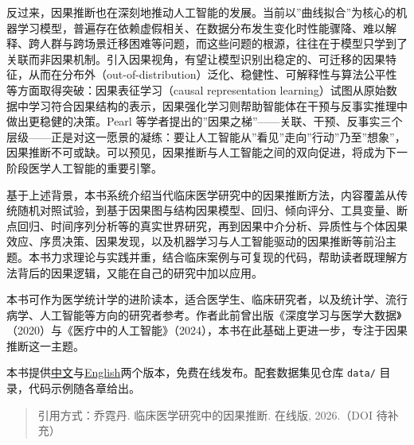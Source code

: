 \documentclass[
  chinese-hans,
  letterpaper,
  DIV=11,
  numbers=noendperiod]{scrreprt}
\begin{document}
反过来，因果推断也在深刻地推动人工智能的发展。当前以''曲线拟合''为核心的机器学习模型，普遍存在依赖虚假相关、在数据分布发生变化时性能骤降、难以解释、跨人群与跨场景迁移困难等问题，而这些问题的根源，往往在于模型只学到了关联而非因果机制。引入因果视角，有望让模型识别出稳定的、可迁移的因果特征，从而在分布外（out-of-distribution）泛化、稳健性、可解释性与算法公平性等方面取得突破：因果表征学习（causal
representation
learning）试图从原始数据中学习符合因果结构的表示，因果强化学习则帮助智能体在干预与反事实推理中做出更稳健的决策。Pearl
等学者提出的''因果之梯''------关联、干预、反事实三个层级------正是对这一愿景的凝练：要让人工智能从''看见''走向''行动''乃至''想象''，因果推断不可或缺。可以预见，因果推断与人工智能之间的双向促进，将成为下一阶段医学人工智能的重要引擎。

基于上述背景，本书系统介绍当代临床医学研究中的因果推断方法，内容覆盖从传统随机对照试验，到基于因果图与结构因果模型、回归、倾向评分、工具变量、断点回归、时间序列分析等的真实世界研究，再到因果中介分析、异质性与个体因果效应、序贯决策、因果发现，以及机器学习与人工智能驱动的因果推断等前沿主题。本书力求理论与实践并重，结合临床案例与可复现的代码，帮助读者既理解方法背后的因果逻辑，又能在自己的研究中加以应用。

本书可作为医学统计学的进阶读本，适合医学生、临床研究者，以及统计学、流行病学、人工智能等方向的研究者参考。作者此前曾出版《深度学习与医学大数据》（2020）与《医疗中的人工智能》（2024），本书在此基础上更进一步，专注于因果推断这一主题。

\begin{tcolorbox}[enhanced jigsaw, arc=.35mm, bottomrule=.15mm, bottomtitle=1mm, breakable, colback=white, colbacktitle=quarto-callout-note-color!10!white, colframe=quarto-callout-note-color-frame, coltitle=black, left=2mm, leftrule=.75mm, opacityback=0, opacitybacktitle=0.6, rightrule=.15mm, title=\textcolor{quarto-callout-note-color}{\faInfo}\hspace{0.5em}{关于本在线版}, titlerule=0mm, toprule=.15mm, toptitle=1mm]

本书提供\href{../zh/}{中文}与\href{../en/}{English}两个版本，免费在线发布。配套数据集见仓库
\texttt{data/} 目录，代码示例随各章给出。

\end{tcolorbox}

\begin{quote}
引用方式：乔霓丹. 临床医学研究中的因果推断. 在线版, 2026.（DOI 待补充）
\end{quote}

\end{document}
